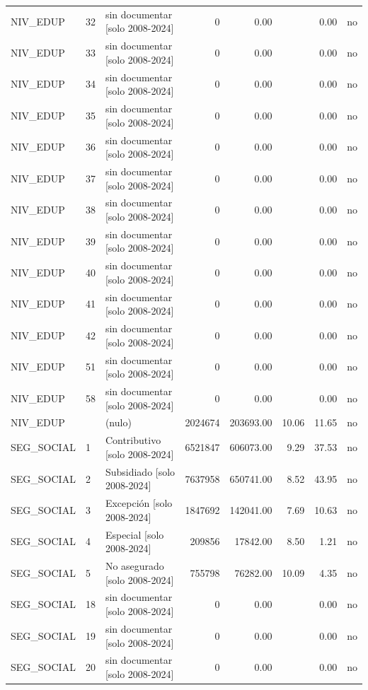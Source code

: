 \begin{tabular}{lllrrrrr}
NIV\_EDUP & 32 & sin documentar  [solo 2008-2024] & 0 & 0.00 &  & 0.00 & no \\
NIV\_EDUP & 33 & sin documentar  [solo 2008-2024] & 0 & 0.00 &  & 0.00 & no \\
NIV\_EDUP & 34 & sin documentar  [solo 2008-2024] & 0 & 0.00 &  & 0.00 & no \\
NIV\_EDUP & 35 & sin documentar  [solo 2008-2024] & 0 & 0.00 &  & 0.00 & no \\
NIV\_EDUP & 36 & sin documentar  [solo 2008-2024] & 0 & 0.00 &  & 0.00 & no \\
NIV\_EDUP & 37 & sin documentar  [solo 2008-2024] & 0 & 0.00 &  & 0.00 & no \\
NIV\_EDUP & 38 & sin documentar  [solo 2008-2024] & 0 & 0.00 &  & 0.00 & no \\
NIV\_EDUP & 39 & sin documentar  [solo 2008-2024] & 0 & 0.00 &  & 0.00 & no \\
NIV\_EDUP & 40 & sin documentar  [solo 2008-2024] & 0 & 0.00 &  & 0.00 & no \\
NIV\_EDUP & 41 & sin documentar  [solo 2008-2024] & 0 & 0.00 &  & 0.00 & no \\
NIV\_EDUP & 42 & sin documentar  [solo 2008-2024] & 0 & 0.00 &  & 0.00 & no \\
NIV\_EDUP & 51 & sin documentar  [solo 2008-2024] & 0 & 0.00 &  & 0.00 & no \\
NIV\_EDUP & 58 & sin documentar  [solo 2008-2024] & 0 & 0.00 &  & 0.00 & no \\
NIV\_EDUP &  & (nulo) & 2024674 & 203693.00 & 10.06 & 11.65 & no \\
SEG\_SOCIAL & 1 & Contributivo  [solo 2008-2024] & 6521847 & 606073.00 & 9.29 & 37.53 & no \\
SEG\_SOCIAL & 2 & Subsidiado  [solo 2008-2024] & 7637958 & 650741.00 & 8.52 & 43.95 & no \\
SEG\_SOCIAL & 3 & Excepción  [solo 2008-2024] & 1847692 & 142041.00 & 7.69 & 10.63 & no \\
SEG\_SOCIAL & 4 & Especial  [solo 2008-2024] & 209856 & 17842.00 & 8.50 & 1.21 & no \\
SEG\_SOCIAL & 5 & No asegurado  [solo 2008-2024] & 755798 & 76282.00 & 10.09 & 4.35 & no \\
SEG\_SOCIAL & 18 & sin documentar  [solo 2008-2024] & 0 & 0.00 &  & 0.00 & no \\
SEG\_SOCIAL & 19 & sin documentar  [solo 2008-2024] & 0 & 0.00 &  & 0.00 & no \\
SEG\_SOCIAL & 20 & sin documentar  [solo 2008-2024] & 0 & 0.00 &  & 0.00 & no \\

\end{tabular}
